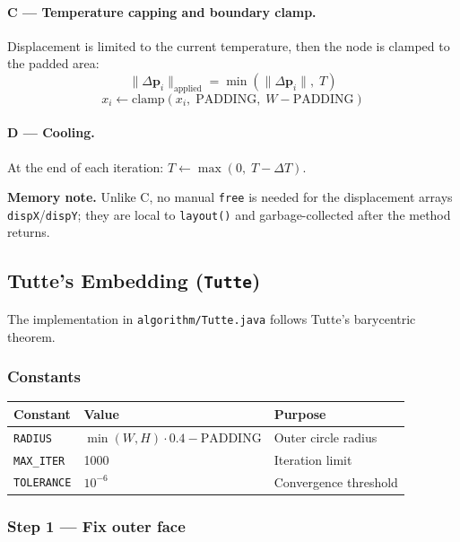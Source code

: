 \documentclass[12pt,a4paper]{article}
\begin{document}
\paragraph{C — Temperature capping and boundary clamp.}
Displacement is limited to the current temperature, then the node is
clamped to the padded area:
\[
  \|\Delta \mathbf{p}_i\|_{\text{applied}} = \min(\|\Delta \mathbf{p}_i\|,\; T)
\]
\[
  x_i \leftarrow \text{clamp}(x_i,\; \text{PADDING},\; W - \text{PADDING})
\]

\paragraph{D — Cooling.}
At the end of each iteration: $T \leftarrow \max(0,\; T - \Delta T)$.

\textbf{Memory note.} Unlike C, no manual \texttt{free} is needed for the
displacement arrays \texttt{dispX}/\texttt{dispY}; they are local to
\texttt{layout()} and garbage-collected after the method returns.

\subsection{Tutte's Embedding (\texttt{Tutte})}

The implementation in \texttt{algorithm/Tutte.java} follows Tutte's
barycentric theorem.

\subsubsection*{Constants}

\begin{center}
\begin{tabular}{lll}
\toprule
\textbf{Constant} & \textbf{Value} & \textbf{Purpose} \\
\midrule
\texttt{RADIUS}    & $\min(W,H)\!\cdot\!0.4 - \text{PADDING}$ & Outer circle radius \\
\texttt{MAX\_ITER} & 1000  & Iteration limit \\
\texttt{TOLERANCE} & $10^{-6}$ & Convergence threshold \\
\bottomrule
\end{tabular}
\end{center}

\subsubsection*{Step 1 — Fix outer face}
\end{document}
